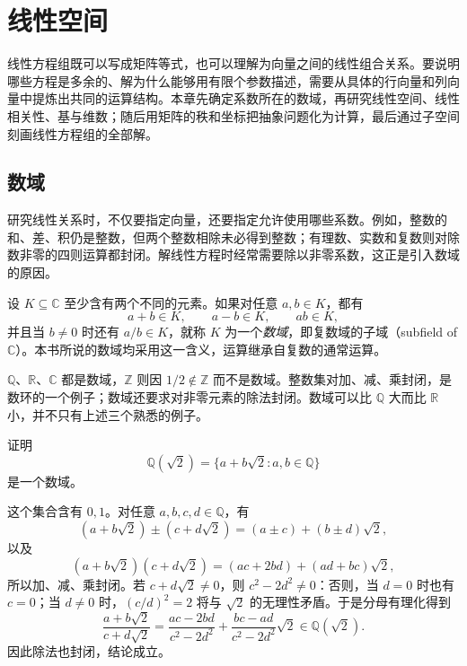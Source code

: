 \setcounter{chapter}{2} %
\chapter{线性空间}
\label{chap:linear-spaces}

线性方程组既可以写成矩阵等式，也可以理解为向量之间的线性组合关系。要说明哪些方程是多余的、解为什么能够用有限个参数描述，需要从具体的行向量和列向量中提炼出共同的运算结构。本章先确定系数所在的数域，再研究线性空间、线性相关性、基与维数；随后用矩阵的秩和坐标把抽象问题化为计算，最后通过子空间刻画线性方程组的全部解。

\section{数域}
\label{sec:number-fields}

研究线性关系时，不仅要指定向量，还要指定允许使用哪些系数。例如，整数的和、差、积仍是整数，但两个整数相除未必得到整数；有理数、实数和复数则对除数非零的四则运算都封闭。解线性方程时经常需要除以非零系数，这正是引入数域的原因。

\begin{definition}
\label{def:number-field}
设 $K\subseteq\mathbb C$ 至少含有两个不同的元素。如果对任意 $a,b\in K$，都有
\[
    a+b\in K,\qquad a-b\in K,\qquad ab\in K,
\]
并且当 $b\ne0$ 时还有 $a/b\in K$，就称 $K$ 为一个\emph{数域}，即复数域的子域（subfield of $\mathbb C$）。本书所说的数域均采用这一含义，运算继承自复数的通常运算。
\end{definition}

$\mathbb Q$、$\mathbb R$、$\mathbb C$ 都是数域，$\mathbb Z$ 则因 $1/2\notin\mathbb Z$ 而不是数域。整数集对加、减、乘封闭，是数环的一个例子；数域还要求对非零元素的除法封闭。数域可以比 $\mathbb Q$ 大而比 $\mathbb R$ 小，并不只有上述三个熟悉的例子。

\begin{example}
\label{ex:quadratic-number-field}
证明
\[
    \mathbb Q(\sqrt2)=\{a+b\sqrt2:a,b\in\mathbb Q\}
\]
是一个数域。
\end{example}

\begin{solve}
这个集合含有 $0,1$。对任意 $a,b,c,d\in\mathbb Q$，有
\[
    (a+b\sqrt2)\pm(c+d\sqrt2)=(a\pm c)+(b\pm d)\sqrt2,
\]
以及
\[
    (a+b\sqrt2)(c+d\sqrt2)=(ac+2bd)+(ad+bc)\sqrt2,
\]
所以加、减、乘封闭。若 $c+d\sqrt2\ne0$，则 $c^2-2d^2\ne0$：否则，当 $d=0$ 时也有 $c=0$；当 $d\ne0$ 时，$(c/d)^2=2$ 将与 $\sqrt2$ 的无理性矛盾。于是分母有理化得到
\[
    \frac{a+b\sqrt2}{c+d\sqrt2}
    =\frac{ac-2bd}{c^2-2d^2}
     +\frac{bc-ad}{c^2-2d^2}\sqrt2\in\mathbb Q(\sqrt2).
\]
因此除法也封闭，结论成立。
\end{solve}

